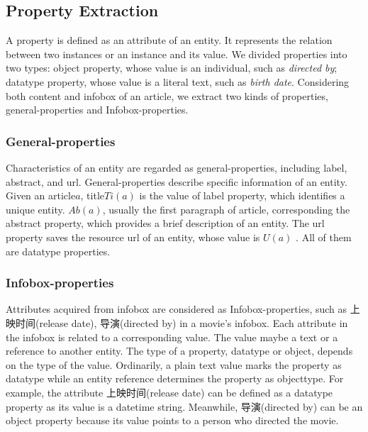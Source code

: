 \documentclass[runningheads,a4paper]{llncs}
\begin{document}
\subsection{Property Extraction}
\label{sec:pe}
A property is defined as an attribute of an entity. It represents the relation between two instances or an instance and its value. We divided properties into two types: object property, whose value is an individual, such as \emph{directed by}; datatype property, whose value is a literal text, such as \emph{birth date}. Considering both content and infobox of an article, we extract two kinds of properties, general-properties and Infobox-properties.

\subsubsection{General-properties}
Characteristics of an entity are regarded as general-properties, including label, abstract, and url. General-properties describe specific information of an entity. Given an article$a$, title$Ti(a)$ is the value of label property, which identifies a unique entity. $Ab(a)$, usually the first paragraph of article, corresponding the abstract property, which provides a brief description of an entity. The url property saves the resource url of an entity, whose value is $U(a)$ . All of them are datatype properties.

\subsubsection{Infobox-properties}
Attributes acquired from infobox are considered as Infobox-properties, such as 上映时间(release date), 导演(directed by) in a movie's infobox. Each attribute in the infobox is related to a corresponding value. The value maybe a text or a reference to another entity. The type of a property, datatype or object, depends on the type of the value. Ordinarily, a plain text value marks the property as datatype while an entity reference determines the property as objecttype. For example, the attribute 上映时间(release date) can be defined as a datatype property as its value is a datetime string. Meanwhile, 导演(directed by) can be an object property because its value points to a person who directed the movie.
\end{document}
